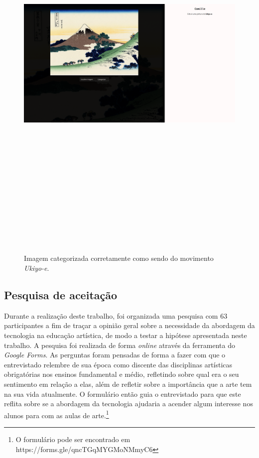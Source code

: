 \documentclass[12pt, a4paper]{article}
\begin{document}
\begin{figure}[H]
	\centering
	\includegraphics[width=\textwidth, height=20cm, keepaspectratio=true]{fig/site_imgcategorized}
	\caption{Imagem categorizada corretamente como sendo do movimento \emph{Ukiyo-e}.}
\end{figure}

\subsection{Pesquisa de aceitação}
Durante a realização deste trabalho, foi organizada uma pesquisa com 63 participantes a fim de traçar a opinião geral sobre a necessidade da abordagem da tecnologia na educação artística, de modo a testar a hipótese apresentada neste trabalho. A pesquisa foi realizada de forma \emph{online} através da ferramenta do 
\emph{Google Forms}.
As perguntas foram pensadas de forma a fazer com que o entrevistado relembre de sua época como discente das disciplinas artísticas obrigatórias nos ensinos fundamental e médio, refletindo sobre qual era o seu sentimento em relação a elas, além de refletir sobre a importância que a arte tem na sua vida atualmente. O formulário então guia o entrevistado para que este reflita sobre se a abordagem da tecnologia ajudaria a acender algum interesse nos alunos para com as aulas de arte.\footnote{O formulário pode ser encontrado em https://forms.gle/qncTGqMYGMoNMmyC6}
\end{document}
